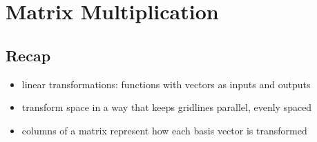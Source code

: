 \section{Matrix Multiplication}
\subsection{Recap}
\begin{itemize}
    \item linear transformations: functions with vectors as inputs and outputs
    \item transform space in a way that keeps gridlines parallel, evenly spaced
    \item columns of a matrix represent how each basis vector is transformed
\end{itemize}